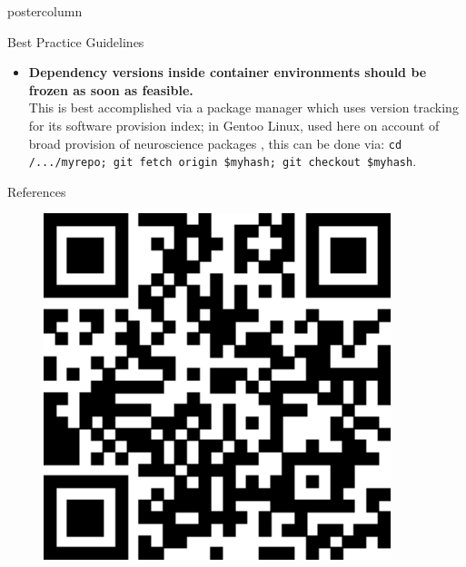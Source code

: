 \begin{frame}
\begin{columns}
\begin{column}{.42\textwidth}
\begin{beamercolorbox}[center]{postercolumn}
\begin{minipage}{.98\textwidth}
{\begin{myblock}{Best Practice Guidelines}
\begin{itemize}
							\item \textbf{Dependency versions inside container environments should be frozen as soon as feasible.}\\
								This is best accomplished via a package manager which uses version tracking for its software provision index; in Gentoo Linux, used here on account of broad provision of neuroscience packages \cite{ng}, this can be done via: \colorbox{elg}{\texttt{cd /.../myrepo; git fetch origin \$myhash; git checkout \$myhash}}.
						\end{itemize}
					\end{myblock}\vfill
					\begin{myblock}{References}
						\vspace{0.5em}
						\begin{minipage}{.3\textwidth}
							\begin{figure}
								\includegraphics[width=0.9\textwidth]{figs/qr.eps}
							\end{figure}
						\end{minipage}
						\begin{minipage}{.69\textwidth}
							\scriptsize

\end{minipage}
\end{myblock}}
\end{minipage}
\end{beamercolorbox}
\end{column}
\end{columns}
\end{frame}
